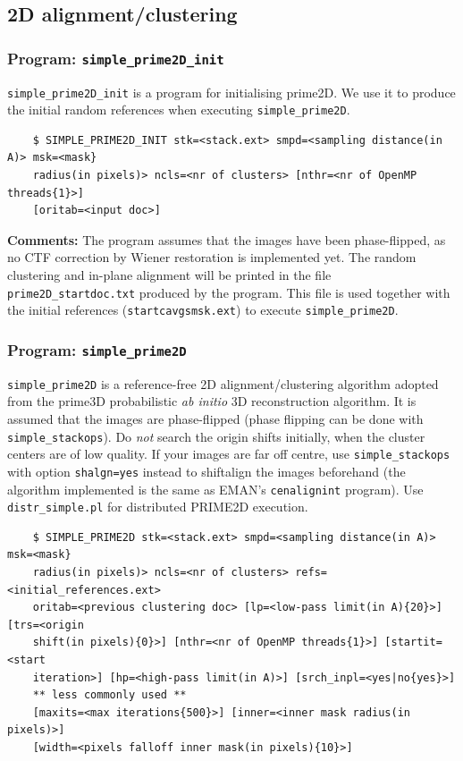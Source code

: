 \documentclass[a4paper,11pt]{article}
\newcommand{\prgname}[1]{\textcolor{NavyBlue}{\texttt{#1}}}
\begin{document}
\subsection{2D alignment/clustering}

\subsubsection{Program: \prgname{simple\_prime2D\_init}}
\label{prime2D_init}
\prgname{simple\_prime2D\_init} is a program for initialising prime2D. We use it to produce the initial random references when executing \prgname{simple\_prime2D}.
\begin{verbatim}
    $ SIMPLE_PRIME2D_INIT stk=<stack.ext> smpd=<sampling distance(in A)> msk=<mask}
    radius(in pixels)> ncls=<nr of clusters> [nthr=<nr of OpenMP threads{1}>]
    [oritab=<input doc>]
\end{verbatim}
\noindent\textbf{Comments:} The program assumes that the images have been phase-flipped, as no CTF correction by Wiener restoration is implemented yet. The random clustering and in-plane alignment will be printed in the file \texttt{prime2D\_startdoc.txt} produced by the program. This file is used together with the initial references (\texttt{startcavgsmsk.ext}) to execute \prgname{simple\_prime2D}.

\subsubsection{Program: \prgname{simple\_prime2D}}
\label{prime2D}
\prgname{simple\_prime2D} is a reference-free 2D alignment/clustering algorithm adopted from the prime3D probabilistic \textit{ab initio} 3D reconstruction algorithm. It is assumed that the images are phase-flipped (phase flipping can be done with \prgname{simple\_stackops}). Do \textit{not} search the origin shifts initially, when the cluster centers are of low quality. If your images are far off centre, use \prgname{simple\_stackops} with option \texttt{shalgn=yes} instead to shiftalign the images beforehand (the algorithm implemented is the same as EMAN's \texttt{cenalignint} program). Use \prgname{distr\_simple.pl} for distributed PRIME2D execution.
\begin{verbatim}
    $ SIMPLE_PRIME2D stk=<stack.ext> smpd=<sampling distance(in A)> msk=<mask}
    radius(in pixels)> ncls=<nr of clusters> refs=<initial_references.ext>
    oritab=<previous clustering doc> [lp=<low-pass limit(in A){20}>] [trs=<origin
    shift(in pixels){0}>] [nthr=<nr of OpenMP threads{1}>] [startit=<start
    iteration>] [hp=<high-pass limit(in A)>] [srch_inpl=<yes|no{yes}>]
    ** less commonly used **
    [maxits=<max iterations{500}>] [inner=<inner mask radius(in pixels)>]
    [width=<pixels falloff inner mask(in pixels){10}>]
\end{verbatim}
\end{document}
